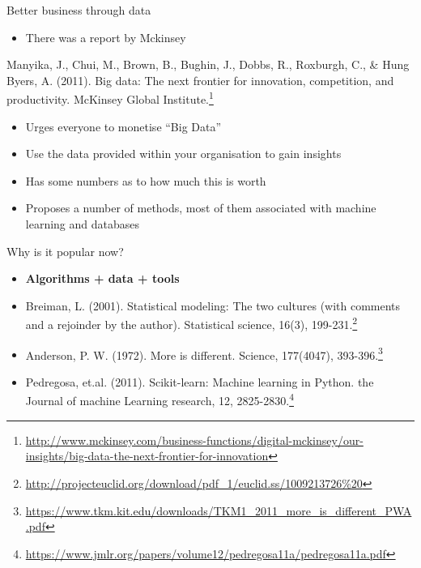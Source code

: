 \documentclass[obeyspaces,aspectratio=43]{beamer}
\renewcommand{\href}[2]{#2\footnote{\url{#1}}}
\providecommand{\tightlist}{%
  \setlength{\itemsep}{0pt}\setlength{\parskip}{0pt}}
\begin{document}
\begin{frame}{Better business through data}

\begin{itemize}
\tightlist
\item
  There was a report by Mckinsey
\end{itemize}

\href{http://www.mckinsey.com/business-functions/digital-mckinsey/our-insights/big-data-the-next-frontier-for-innovation}{Manyika,
J., Chui, M., Brown, B., Bughin, J., Dobbs, R., Roxburgh, C., \& Hung
Byers, A. (2011). Big data: The next frontier for innovation,
competition, and productivity. McKinsey Global Institute.}

\begin{itemize}
\tightlist
\item
  Urges everyone to monetise ``Big Data''
\item
  Use the data provided within your organisation to gain insights
\item
  Has some numbers as to how much this is worth
\item
  Proposes a number of methods, most of them associated with machine
  learning and databases
\end{itemize}

\end{frame}

\begin{frame}{Why is it popular now?}

\begin{itemize}
\item
  \textbf{Algorithms + data + tools}
\item
  \href{http://projecteuclid.org/download/pdf_1/euclid.ss/1009213726\%20}{Breiman,
  L. (2001). Statistical modeling: The two cultures (with comments and a
  rejoinder by the author). Statistical science, 16(3), 199-231.}
\item
  \href{https://www.tkm.kit.edu/downloads/TKM1_2011_more_is_different_PWA.pdf}{Anderson,
  P. W. (1972). More is different. Science, 177(4047), 393-396.}
\item
  \href{https://www.jmlr.org/papers/volume12/pedregosa11a/pedregosa11a.pdf}{Pedregosa,
  et.al. (2011). Scikit-learn: Machine learning in Python. the Journal
  of machine Learning research, 12, 2825-2830.}
\end{itemize}

\end{frame}
\end{document}
